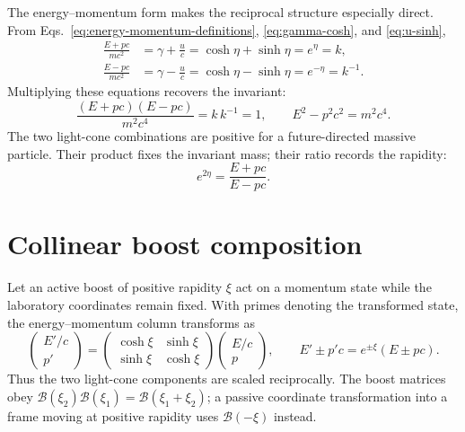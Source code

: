 \documentclass[12pt]{article}
\begin{document}
The energy--momentum form makes the reciprocal structure especially direct. From Eqs.~\eqref{eq:energy-momentum-definitions}, \eqref{eq:gamma-cosh}, and \eqref{eq:u-sinh},
\begin{align}
  \frac{E+pc}{mc^2}
  &=\gamma+\frac{u}{c}
   =\cosh\eta+\sinh\eta=e^\eta=k,
  \label{eq:light-cone-plus}\\
  \frac{E-pc}{mc^2}
  &=\gamma-\frac{u}{c}
   =\cosh\eta-\sinh\eta=e^{-\eta}=k^{-1}.
  \label{eq:light-cone-minus}
\end{align}
Multiplying these equations recovers the invariant:
\begin{equation}
  \frac{(E+pc)(E-pc)}{m^2c^4}=k\,k^{-1}=1,
  \qquad E^2-p^2c^2=m^2c^4.
  \label{eq:reciprocal-invariant}
\end{equation}
The two light-cone combinations are positive for a future-directed massive particle. Their product fixes the invariant mass; their ratio records the rapidity:
\begin{equation}
  e^{2\eta}=\frac{E+pc}{E-pc}.
  \label{eq:rapidity-energy-ratio}
\end{equation}

\section{Collinear boost composition}
\label{sec:composition}

Let an active boost of positive rapidity $\xi$ act on a momentum state while the laboratory coordinates remain fixed. With primes denoting the transformed state, the energy--momentum column transforms as
\begin{equation}
  \begin{pmatrix} E'/c \\ p' \end{pmatrix}
  =\begin{pmatrix}
    \cosh\xi & \sinh\xi \\ \sinh\xi & \cosh\xi
  \end{pmatrix}
  \begin{pmatrix} E/c \\ p \end{pmatrix},
  \qquad
  E'\pm p'c=e^{\pm\xi}(E\pm pc).
  \label{eq:active-boost}
\end{equation}
Thus the two light-cone components are scaled reciprocally. The boost matrices obey $\mathcal{B}(\xi_2)\mathcal{B}(\xi_1)=\mathcal{B}(\xi_1+\xi_2)$; a passive coordinate transformation into a frame moving at positive rapidity uses $\mathcal{B}(-\xi)$ instead.
\end{document}
